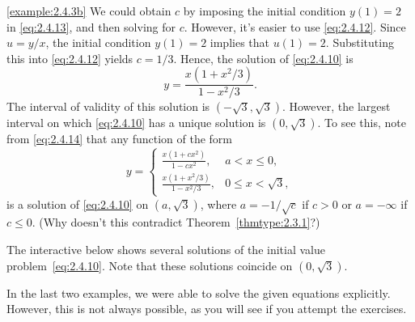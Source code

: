 \documentclass{ximera}
\begin{document}
\begin{example}
\begin{explanation}
\ref{example:2.4.3b}  We could obtain $c$ by imposing
the initial condition $y(1)=2$ in \eqref{eq:2.4.13}, and then solving for
$c$. However, it's easier to use \eqref{eq:2.4.12}. Since $u=y/x$, the
initial
condition
$y(1)=2$ implies that $u(1)=2$.  Substituting this into \eqref{eq:2.4.12}
yields $c=1/3$.  Hence, the solution of \eqref{eq:2.4.10} is
$$
y=\frac{x(1+x^2/3)}{1-x^2/3}.
$$
The interval of validity of this solution is $(-\sqrt{3},\sqrt{3})$.
However, the largest interval on which \eqref{eq:2.4.10} has a unique
solution is $(0,\sqrt{3})$. To see this, note from \eqref{eq:2.4.14}
that any function of the form
\begin{equation} \label{eq:2.4.15}
y=\left\{\begin{array}{ll} \frac{x(1+cx^2)}{1-cx^2},&a<x\leq 0,\\
\frac{x(1+x^2/3)}{1-x^2/3},&0\leq x<\sqrt{3},
\end{array}\right.
\end{equation}
is a solution of \eqref{eq:2.4.10} on $(a,\sqrt{3})$, where $a=-1/\sqrt c$
if $c>0$ or $a=-\infty$ if $c\leq 0$. (Why doesn't this contradict
Theorem~\ref{thmtype:2.3.1}?)


The interactive below shows several solutions of the
initial value problem~\eqref{eq:2.4.10}. Note that these solutions coincide
on $(0,\sqrt{3})$.
\end{explanation}
\end{example}

\begin{center}
\end{center}

In the last two examples, we were able to solve the given equations
explicitly.   However, this is not  always possible, as you will
see if you attempt the exercises.
\end{document}
